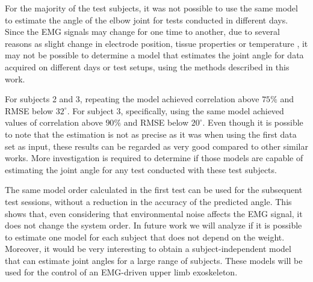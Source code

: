 \documentclass[letterpaper, 10 pt, conference]{ieeeconf}  %
\begin{document}

For the majority of the test subjects, it was not possible to use the same model to estimate the angle of the elbow joint for tests conducted in different days. Since the EMG signals may change for one time to another, due to several reasons as slight change in electrode position, tissue properties or temperature \cite{soderberg1975}, it may not be possible to determine a model that estimates the joint angle for data acquired on different days or test setups, using the methods described in this work.

\addtolength{\textheight}{-4.5cm} %

For subjects 2 and 3, repeating the model achieved correlation above $75\%$ and RMSE below $32^\circ$. For subject 3, specifically, using the same model achieved values of correlation above $90\%$ and RMSE below $20^\circ$. Even though it is possible to note that the estimation is not as precise as it was when using the first data set as input, these results can be regarded as very good compared to other similar works. More investigation is required to determine if those models are capable of estimating the joint angle for any test conducted with these test subjects.
% 
% 

% 
% 

The same model order calculated in the first test can be used for the subsequent test sessions, without a reduction in the accuracy of the predicted angle. This shows that, even considering that environmental noise affects the EMG signal, it does not change the system order. In future work we will analyze if it is possible to estimate one model for each subject that does not depend on the weight. Moreover, it would be very interesting to obtain a subject-independent model that can estimate joint angles for a large range of subjects. These models will be used for the control of an EMG-driven upper limb exoskeleton.
\end{document}
